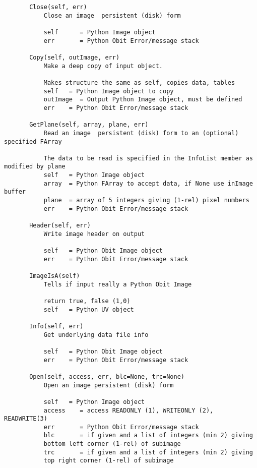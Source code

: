 \documentclass[11pt]{report}
\begin{document}
\begin{verbatim}
       Close(self, err)
           Close an image  persistent (disk) form
           
           self      = Python Image object
           err       = Python Obit Error/message stack
       
       Copy(self, outImage, err)
           Make a deep copy of input object.
           
           Makes structure the same as self, copies data, tables
           self   = Python Image object to copy
           outImage  = Output Python Image object, must be defined
           err    = Python Obit Error/message stack
       
       GetPlane(self, array, plane, err)
           Read an image  persistent (disk) form to an (optional) specified FArray
           
           The data to be read is specified in the InfoList member as modified by plane
           self   = Python Image object
           array  = Python FArray to accept data, if None use inImage buffer
           plane  = array of 5 integers giving (1-rel) pixel numbers
           err    = Python Obit Error/message stack
       
       Header(self, err)
           Write image header on output
           
           self   = Python Obit Image object
           err    = Python Obit Error/message stack
       
       ImageIsA(self)
           Tells if input really a Python Obit Image
           
           return true, false (1,0)
           self   = Python UV object
       
       Info(self, err)
           Get underlying data file info
           
           self   = Python Obit Image object
           err    = Python Obit Error/message stack
       
       Open(self, access, err, blc=None, trc=None)
           Open an image persistent (disk) form
           
           self   = Python Image object
           access    = access READONLY (1), WRITEONLY (2), READWRITE(3)
           err       = Python Obit Error/message stack
           blc       = if given and a list of integers (min 2) giving
           bottom left corner (1-rel) of subimage
           trc       = if given and a list of integers (min 2) giving
           top right corner (1-rel) of subimage
       

\end{verbatim}
\end{document}
